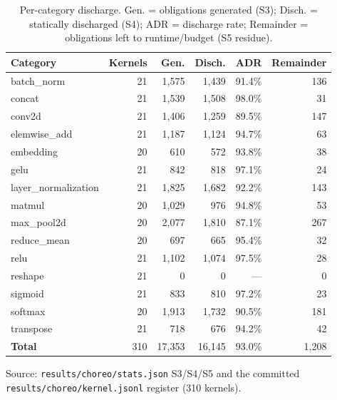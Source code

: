 \begin{table}[t]
\centering\footnotesize
\caption{Per-category discharge. Gen. = obligations generated (S3); Disch. = statically discharged (S4); ADR = discharge rate; Remainder = obligations left to runtime/budget (S5 residue).}
\label{tab:rq1-category}
\begin{tabular}{@{}lrrrrr@{}}
\toprule
Category & Kernels & Gen. & Disch. & ADR & Remainder \\
\midrule
batch\_norm & 21 & 1,575 & 1,439 & 91.4\% & 136 \\
concat & 21 & 1,539 & 1,508 & 98.0\% & 31 \\
conv2d & 21 & 1,406 & 1,259 & 89.5\% & 147 \\
elemwise\_add & 21 & 1,187 & 1,124 & 94.7\% & 63 \\
embedding & 20 & 610 & 572 & 93.8\% & 38 \\
gelu & 21 & 842 & 818 & 97.1\% & 24 \\
layer\_normalization & 21 & 1,825 & 1,682 & 92.2\% & 143 \\
matmul & 20 & 1,029 & 976 & 94.8\% & 53 \\
max\_pool2d & 20 & 2,077 & 1,810 & 87.1\% & 267 \\
reduce\_mean & 20 & 697 & 665 & 95.4\% & 32 \\
relu & 21 & 1,102 & 1,074 & 97.5\% & 28 \\
reshape & 21 & 0 & 0 & --- & 0 \\
sigmoid & 21 & 833 & 810 & 97.2\% & 23 \\
softmax & 20 & 1,913 & 1,732 & 90.5\% & 181 \\
transpose & 21 & 718 & 676 & 94.2\% & 42 \\
\textbf{Total} & 310 & 17,353 & 16,145 & 93.0\% & 1,208 \\
\bottomrule
\end{tabular}
\vspace{0.4em}\begin{minipage}{0.98\linewidth}\raggedright\footnotesize Source: \texttt{results/choreo/stats.json} S3/S4/S5 and the committed \texttt{results/choreo/kernel.jsonl} register (310 kernels).\end{minipage}
\end{table}
